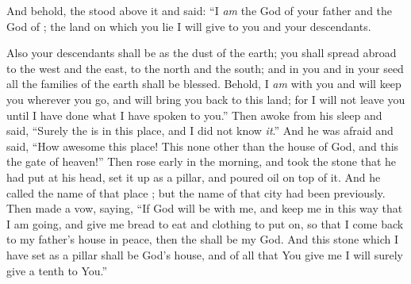 \bverse And behold, the \lord stood above it and said: ``I \textit{am} the \lord God of \Abraham your father and the God of \Isaac; the land on which you lie I will give to you and your descendants.

\bverse Also your descendants shall be as the dust of the earth; you shall spread abroad to the west and the east, to the north and the south; and in you and in your seed all the families of the earth shall be blessed. 
\bverse Behold, I \textit{am} with you and will keep you wherever you go, and will bring you back to this land; for I will not leave you until I have done what I have spoken to you.''
\bverse Then \Jacob awoke from his sleep and said, ``Surely the \lord is in this place, and I did not know \textit{it}.''
\bverse And he was afraid and said, ``How awesome \is this place! This \is none other than the house of God, and this \is the gate of heaven!''
\bverse Then \Jacob rose early in the morning, and took the stone that he had put at his head, set it up as a pillar, and poured oil on top of it.
\bverse And he called the name of that place \Bethel; but the name of that city had been  previously.
\bverse Then \Jacob made a vow, saying, ``If God will be with me, and keep me in this way that I am going, and give me bread to eat and clothing to put on,
\bverse so that I come back to my father's house in peace, then the \lord shall be my God.
\bverse And this stone which I have set as a pillar shall be God's house, and of all that You give me I will surely give a tenth to You.''
